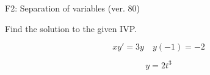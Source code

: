 \begin{exercise}
  \begin{exerciseTitle}F2: Separation of variables (ver. 80)\end{exerciseTitle}
  \begin{exerciseStatement}
    
Find the solution to the given IVP.

    
\[xy'= 3 y \hspace{1em} y( -1 ) = -2\]

  \end{exerciseStatement}
  \begin{exerciseAnswer}
    
\[y= 2 t^ 3\]

  \end{exerciseAnswer}
\end{exercise}
